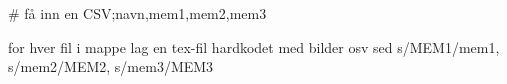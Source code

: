 
# få inn en CSV;navn,mem1,mem2,mem3

for hver fil i mappe
lag en tex-fil
hardkodet med bilder osv 
sed s/MEM1/mem1, s/mem2/MEM2, s/mem3/MEM3
